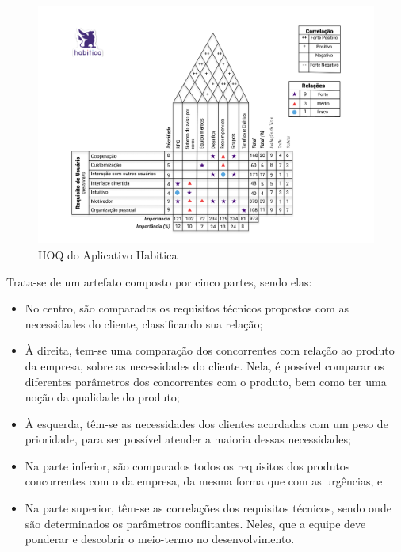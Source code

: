 \begin{figure}[H]
    \begin{center}
        \caption{HOQ do Aplicativo Habitica}
        \label{fig:hoq}
        \includegraphics[scale=0.45]{figuras/referencial_teorico/HOQ.jpg}
    \end{center}
\end{figure}

Trata-se de um artefato composto por cinco partes, sendo elas:

\begin{itemize}
    \item No centro, são comparados os requisitos técnicos propostos com as necessidades do cliente, classificando sua relação;
    \item À direita, tem-se uma comparação dos concorrentes com relação ao produto da empresa, sobre as necessidades do cliente. Nela, é possível comparar os diferentes parâmetros dos concorrentes com o produto, bem como ter uma noção da qualidade do produto;
    \item À esquerda, têm-se as necessidades dos clientes acordadas com um peso de prioridade, para ser possível atender a maioria dessas necessidades;
    \item Na parte inferior, são comparados todos os requisitos dos produtos concorrentes com o da empresa, da mesma forma que com as urgências, e
    \item Na parte superior, têm-se as correlações dos requisitos técnicos, sendo onde são determinados os parâmetros conflitantes. Neles, que a equipe deve ponderar e descobrir o meio-termo no desenvolvimento.
\end{itemize}

